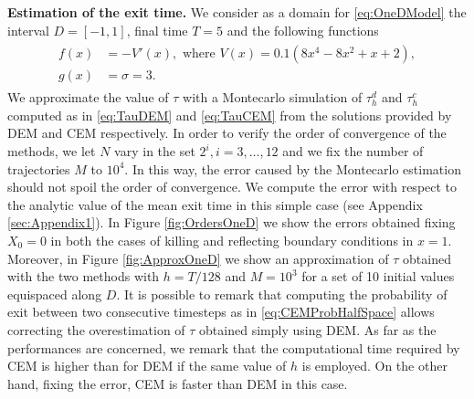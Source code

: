 
\vspace{2mm}
\noindent \textbf{Estimation of the exit time.} We consider as a domain for \eqref{eq:OneDModel} the interval $D = \left[-1,1\right]$, final time $T = 5$ and the following functions
\begin{align}\label{eq:FunctionsOneDSmooth}
\begin{split}
	f(x) &= -V'(x), \text{ where } V(x) = 0.1(8x^4 - 8x^2 + x + 2), \\
	g(x) &= \sigma = 3.
\end{split}
\end{align}
We approximate the value of $\tau$ with a Montecarlo simulation of $\tau_h^d$ and $\tau_h^c$ computed as in \eqref{eq:TauDEM} and \eqref{eq:TauCEM} from the solutions provided by DEM and CEM respectively. In order to verify the order of convergence of the methods, we let $N$ vary in the set $2^i,i=3,\dots,12$ and we fix the number of trajectories $M$ to $10^4$. In this way, the error caused by the Montecarlo estimation should not spoil the order of convergence. We compute the error with respect to the analytic value of the mean exit time in this simple case (see Appendix \ref{sec:Appendix1}). In Figure \ref{fig:OrdersOneD} we show the errors obtained fixing $X_0 = 0$ in both the cases of killing and reflecting boundary conditions in $x = 1$. Moreover, in Figure \ref{fig:ApproxOneD} we show an approximation of $\tau$ obtained with the two methods with $h = T/128$ and $M = 10^3$ for a set of 10 initial values equispaced along $D$. It is possible to remark that computing the probability of exit between two consecutive timesteps as in \eqref{eq:CEMProbHalfSpace} allows correcting the overestimation of $\tau$ obtained simply using DEM. As far as the performances are concerned, we remark that the computational time required by CEM is higher than for DEM if the same value of $h$ is employed. On the other hand, fixing the error, CEM is faster than DEM in this case.



